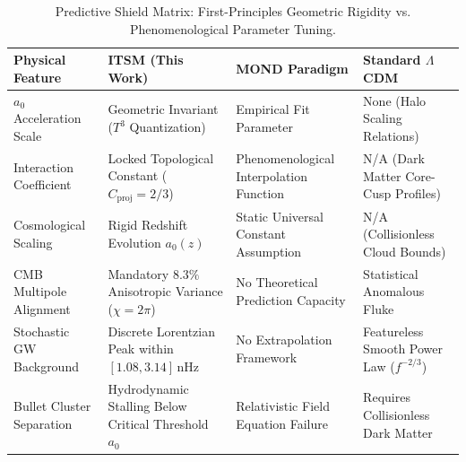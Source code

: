 \documentclass[aps,prd,10pt,twocolumn,superscriptaddress,nofootinbib]{revtex4-2}
\begin{document}
\begin{table}[htbp]
\caption{\label{tab:predictive_shield}Predictive Shield Matrix: First-Principles Geometric Rigidity vs. Phenomenological Parameter Tuning.}
\begin{ruledtabular}
\begin{tabular}{l|l|l|l}
\textbf{Physical Feature} & \textbf{ITSM (This Work)} & \textbf{MOND Paradigm} & \textbf{Standard $\Lambda$CDM} \\
\hline
$a_0$ Acceleration Scale & \parbox[t]{4.5cm}{Geometric Invariant ($T^3$ Quantization)\vspace{1.5mm}} & \parbox[t]{3.5cm}{Empirical Fit Parameter\vspace{1.5mm}} & \parbox[t]{4cm}{None (Halo Scaling Relations)\vspace{1.5mm}} \\ \hline
Interaction Coefficient & \parbox[t]{4.5cm}{Locked Topological Constant ($C_{\text{proj}} = 2/3$)\vspace{1.5mm}} & \parbox[t]{3.5cm}{Phenomenological Interpolation Function\vspace{1.5mm}} & \parbox[t]{4cm}{N/A (Dark Matter Core-Cusp Profiles)\vspace{1.5mm}} \\ \hline
Cosmological Scaling & \parbox[t]{4.5cm}{Rigid Redshift Evolution $a_0(z)$\vspace{1.5mm}} & \parbox[t]{3.5cm}{Static Universal Constant Assumption\vspace{1.5mm}} & \parbox[t]{4cm}{N/A (Collisionless Cloud Bounds)\vspace{1.5mm}} \\ \hline
CMB Multipole Alignment & \parbox[t]{4.5cm}{Mandatory $8.3\%$ Anisotropic Variance ($\chi=2\pi$)\vspace{1.5mm}} & \parbox[t]{3.5cm}{No Theoretical Prediction Capacity\vspace{1.5mm}} & \parbox[t]{4cm}{Statistical Anomalous Fluke\vspace{1.5mm}} \\ \hline
Stochastic GW Background & \parbox[t]{4.5cm}{Discrete Lorentzian Peak within $[1.08, 3.14]\,\text{nHz}$\vspace{1.5mm}} & \parbox[t]{3.5cm}{No Extrapolation Framework\vspace{1.5mm}} & \parbox[t]{4cm}{Featureless Smooth Power Law ($f^{-2/3}$)\vspace{1.5mm}} \\ \hline
Bullet Cluster Separation & \parbox[t]{4.5cm}{Hydrodynamic Stalling Below Critical Threshold $a_0$\vspace{1.5mm}} & \parbox[t]{3.5cm}{Relativistic Field Equation Failure\vspace{1.5mm}} & \parbox[t]{4cm}{Requires Collisionless Dark Matter\vspace{1.5mm}} \\ \hline

\end{tabular}
\end{ruledtabular}
\end{table}
\end{document}
